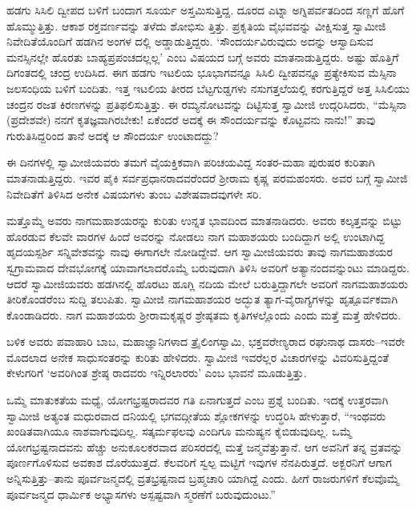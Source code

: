 ಹಡಗು ಸಿಸಿಲಿ ದ್ವೀಪದ ಬಳಿಗೆ ಬಂದಾಗ ಸೂರ್ಯ ಅಸ್ತಮಿಸುತ್ತಿದ್ದ. ದೂರದ ಎಟ್ನಾ ಅಗ್ನಿಪರ್ವತದಿಂದ ಸಣ್ಣಗೆ ಹೊಗೆ ಹೊಮ್ಮುತ್ತಿತ್ತು. ಆಕಾಶ ರಕ್ತವರ್ಣವನ್ನು ತಳೆದು ಶೋಭಿಸು ತ್ತಿತ್ತು. ಪ್ರಕೃತಿಯ ವೈಭವವನ್ನು ವೀಕ್ಷಿಸುತ್ತ ಸ್ವಾಮೀಜಿ ನಿವೇದಿತೆಯೊಂದಿಗೆ ಹಡಗಿನ ಅಂಗಳ ದಲ್ಲಿ ಅಡ್ಡಾಡುತ್ತಿದ್ದರು. ‘ಸೌಂದರ್ಯವಿರುವುದು ಅದನ್ನು ಆಸ್ವಾದಿಸುವ ಮನಸ್ಸಿನಲ್ಲೇ ಹೊರತು ಬಾಹ್ಯಪ್ರಪಂಚದಲ್ಲಲ್ಲ’ ಎಂಬ ವಿಷಯದ ಬಗ್ಗೆ ಅವರು ಮಾತನಾಡುತ್ತಿದ್ದರು. ಅಷ್ಟು ಹೊತ್ತಿಗೆ ದಿಗಂತದಲ್ಲಿ ಚಂದ್ರ ಉದಿಸಿದ. ಈಗ ಹಡಗು ಇಟಲಿಯ ಭೂಭಾಗವನ್ನೂ ಸಿಸಿಲಿ ದ್ವೀಪವನ್ನೂ ಪ್ರತ್ಯೇಕಿಸುವ ಮೆಸ್ಸಿನಾ ಜಲಸಂಧಿಯ ಬಳಿಗೆ ಬಂದಿತು. ಇತ್ತ ಇಟಲಿಯ ತೀರದ ಬೆಟ್ಟಗುಡ್ಡಗಳು ನಸುಗತ್ತಲೆಯಲ್ಲಿ ಕರಗುತ್ತಿದ್ದರೆ ಅತ್ತ ಸಿಸಿಲಿಯು ಚಂದ್ರನ ರಜತ ಕಿರಣಗಳನ್ನು ಪ್ರತಿಫಲಿಸುತ್ತಿತ್ತು. ಈ ರಮ್ಯನೋಟವನ್ನು ದಿಟ್ಟಿಸುತ್ತ ಸ್ವಾಮೀಜಿ ಉದ್ಗರಿಸಿದರು, “ಮೆಸ್ಸಿನಾ (ಪ್ರದೇಶವೇ) ನನಗೆ ಕೃತಜ್ಞವಾಗಿರಬೇಕು! ಏಕೆಂದರೆ ಅದಕ್ಕೆ ಈ ಸೌಂದರ್ಯವನ್ನು ಕೊಟ್ಟವನು ನಾನು!” ತಾವು ಗುರುತಿಸಿದ್ದರಿಂದ ತಾನೆ ಅದಕ್ಕೆ ಆ ಸೌಂದರ್ಯ ಉಂಟಾದದ್ದು?

ಈ ದಿನಗಳಲ್ಲಿ ಸ್ವಾಮೀಜಿಯವರು ತಮಗೆ ವೈಯಕ್ತಿಕವಾಗಿ ಪರಿಚಯವಿದ್ದ ಸಂತರ-ಮಹಾ ಪುರುಷರ ಕುರಿತಾಗಿ ಮಾತನಾಡುತ್ತಿದ್ದರು. ಇವರ ಪೈಕಿ ಸರ್ವಪ್ರಧಾನರಾದವರೆಂದರೆ ಶ್ರೀರಾಮ ಕೃಷ್ಣ ಪರಮಹಂಸರು. ಅವರ ಬಗ್ಗೆ ಸ್ವಾಮೀಜಿ ನಿವೇದಿತೆಗೆ ತಿಳಿಸಿದ ಅನೇಕ ವಿಷಯಗಳು ತುಂಬ ವಿಶೇಷವಾದವುಗಳೇ ಸರಿ.

ಮತ್ತೊಮ್ಮೆ ಅವರು ನಾಗಮಹಾಶಯರನ್ನು ಕುರಿತು ಉನ್ನತ ಭಾವದಿಂದ ಮಾತನಾಡಿದರು. ಅವರು ಕಲ್ಕತ್ತವನ್ನು ಬಿಟ್ಟು ಹೊರಡುವ ಕೆಲವೇ ವಾರಗಳ ಹಿಂದೆ ಅವರನ್ನು ನೋಡಲು ನಾಗ ಮಹಾಶಯರು ಬಂದಿದ್ದಾಗ ಅಲ್ಲಿ ಉಂಟಾಗಿದ್ದ ಹೃದಯಸ್ಪರ್ಶಿ ಸನ್ನಿವೇಶವನ್ನು ನಾವು ಈಗಾಗಲೇ ನೋಡಿದ್ದೇವೆ. ಆಗ ಸ್ವಾಮೀಜಿಯವರು ತಾವು ನಾಗಮಹಾಶಯರ ಸ್ವಗ್ರಾಮವಾದ ದೇವಭೋಗಕ್ಕೆ ಯಾವಾಗಲಾದರೊಮ್ಮೆ ಬರುವುದಾಗಿ ತಿಳಿಸಿ ಅವರಿಗೆ ಅತ್ಯಾನಂದವನ್ನುಂಟು ಮಾಡಿದ್ದರು. ಆದರೆ ಸ್ವಾಮೀಜಿಯವರು ಹಡಗಿನಲ್ಲಿ ಹೊರಟು ಹೂಗ್ಲಿ ನದಿಯ ಮೇಲೆ ಬರುತ್ತಿದ್ದಾಗಲೇ ಅವರಿಗೆ ನಾಗಮಹಾಶಯರು ತೀರಿಕೊಂಡರೆಂಬ ಸುದ್ದಿ ತಲುಪಿತು. ಸ್ವಾಮೀಜಿ ನಾಗಮಹಾಶಯರ ಅದ್ಭುತ ತ್ಯಾಗ-ವೈರಾಗ್ಯಗಳನ್ನು ಹೃತ್ಪೂರ್ವಕವಾಗಿ ಕೊಂಡಾಡಿದರು. ನಾಗ ಮಹಾಶಯರು ಶ್ರೀರಾಮಕೃಷ್ಣರ ಶ್ರೇಷ್ಠತಮ ಕೃತಿಗಳಲ್ಲೊಂದು ಎಂದು ಮತ್ತೆ ಮತ್ತೆ ಹೇಳಿದರು.

ಬಳಿಕ ಅವರು ಪವಾಹಾರಿ ಬಾಬ, ಮಹಾಜ್ಞಾನಿಗಳಾದ ತ್ರೈಲಿಂಗಸ್ವಾಮಿ, ಭಕ್ತವರೇಣ್ಯರಾದ ರಘುನಾಥ ದಾಸರು–ಇವರೇ ಮೊದಲಾದ ಅನೇಕ ಸಾಧುಸಂತರನ್ನು ಕುರಿತು ಹೇಳಿದರು. ಸ್ವಾಮೀಜಿ ಇವರೆಲ್ಲರ ವಿಚಾರಗಳನ್ನು ವಿವರಿಸುತ್ತಿದ್ದಂತೆ ಕೇಳುಗರಿಗೆ ‘ಅವರಿಗಿಂತ ಶ್ರೇಷ್ಠ ರಾದವರು ಇನ್ನಿರಲಾರರು’ ಎಂಬ ಭಾವನೆ ಮೂಡುತ್ತಿತ್ತು.

ಒಮ್ಮೆ ಮಾತುಕತೆಯ ಮಧ್ಯೆ, ಯೋಗಭ್ರಷ್ಟರಾದವರ ಗತಿ ಏನಾಗುತ್ತದೆ ಎಂಬ ಪ್ರಶ್ನೆ ಬಂದಿತು. ಇದಕ್ಕೆ ಉತ್ತರವಾಗಿ ಸ್ವಾಮೀಜಿ ಅತ್ಯಂತ ಮಧುರವಾದ ದನಿಯಲ್ಲಿ ಭಗವದ್ಗೀತೆಯ ಶ್ಲೋಕಗಳನ್ನು ಉದ್ಧರಿಸಿ ಹೇಳುತ್ತಾರೆ, “ಇಂಥವರು ಖಂಡಿತವಾಗಿಯೂ ನಾಶವಾಗುವುದಿಲ್ಲ. ಸತ್ಕರ್ಮಫಲವು ಎಂದಿಗೂ ಮನುಷ್ಯನ ಕೈಬಿಡುವುದಿಲ್ಲ. ಒಮ್ಮೆ ಯೋಗಭ್ರಷ್ಟನಾದವನು ಹೆಚ್ಚು ಅನುಕೂಲಕರವಾದ ಪರಿಸರದಲ್ಲಿ ಮತ್ತೆ ಜನ್ಮವೆತ್ತುತ್ತಾನೆ. ಆಗ ಅವನಿಗೆ ತನ್ನ ವ್ರತವನ್ನು ಪೂರ್ಣಗೊಳಿಸುವ ಅವಕಾಶ ದೊರೆಯುತ್ತದೆ. ಕೆಲವರಿಗೆ ಸ್ವಲ್ಪ ಮಟ್ಟಿಗೆ ಇವುಗಳ ನೆನಪಿರುತ್ತದೆ. ಅಕ್ಬರನಿಗೆ ಆಗಾಗ ಅನ್ನಿಸುತ್ತಿತ್ತು–ತಾನು ಪೂರ್ವಜನ್ಮದಲ್ಲಿ ವ್ರತಭ್ರಷ್ಟನಾದ ಬ್ರಹ್ಮಚಾರಿ ಯಾಗಿದ್ದೆ ಎಂದು. ಹೀಗೆ ರಾಜರುಗಳಿಗೆ ಕೆಲವೊಮ್ಮೆ ಪೂರ್ವಜನ್ಮದ ಧಾರ್ಮಿಕ ಅಭ್ಯಾಸಗಳು ಅಸ್ಪಷ್ಟವಾಗಿ ಸ್ಮರಣೆಗೆ ಬರುವುದುಂಟು.”

